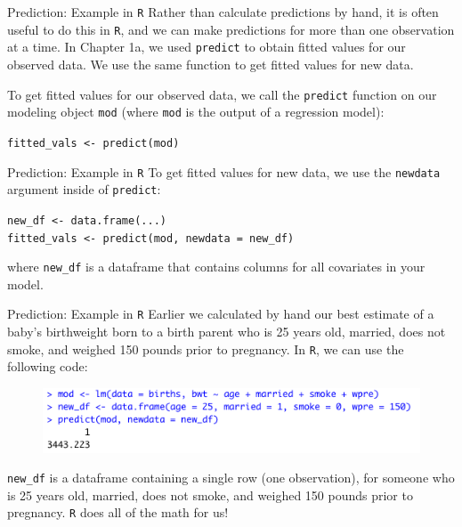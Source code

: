 \documentclass[10pt,t]{beamer}
\begin{document}
\begin{frame}{Prediction: Example in \texttt{R}}
Rather than calculate predictions by hand, it is often useful to do this in \texttt{R}, and we can make predictions for more than one observation at a time. In Chapter 1a, we used \texttt{predict} to obtain fitted values for our observed data. We use the same function to get fitted values for new data.

\vspace{0.3cm}

To get fitted values for our observed data, we call the \texttt{predict} function on our modeling object \texttt{mod} (where \texttt{mod} is the output of a regression model):

\vspace{0.3cm}

\texttt{fitted\_vals <- predict(mod)}
\end{frame}

\begin{frame}{Prediction: Example in \texttt{R}}
To get fitted values for new data, we use the \texttt{newdata} argument inside of \texttt{predict}:

\vspace{0.3cm}

\texttt{new\_df <- data.frame(...)} \\
\texttt{fitted\_vals <- predict(mod, newdata = new\_df)}

\vspace{0.3cm}

where \texttt{new\_df} is a dataframe that contains columns for all covariates in your model.

\end{frame}

\begin{frame}{Prediction: Example in \texttt{R}}
Earlier we calculated by hand our best estimate of a baby's birthweight born to a birth parent who is 25 years old, married, does not smoke, and weighed 150 pounds prior to pregnancy. In \texttt{R}, we can use the following code:

\vspace{0.3cm}

\begin{figure}
	\centering \includegraphics[scale=0.5]{figures/newdata_example.png}
\end{figure}

\vspace{0.3cm}

\texttt{new\_df} is a dataframe containing a single row (one observation), for someone who is 25 years old, married, does not smoke, and weighed 150 pounds prior to pregnancy. \texttt{R} does all of the math for us!

\end{frame}
\end{document}
